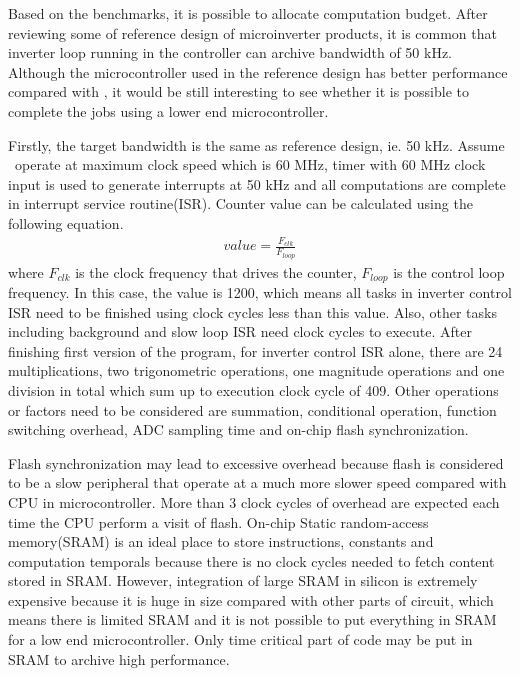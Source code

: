 Based on the benchmarks, it is possible to allocate computation budget. After reviewing some of reference design of  microinverter products, it is common that inverter loop running in the controller can archive bandwidth of 50 kHz. Although the microcontroller used in the reference design\cite{inverter_ref} has better performance compared with \tms, it would be still interesting to see whether it is possible to complete the jobs using a lower end microcontroller. 

Firstly, the target bandwidth is the same as reference design, ie. 50 kHz. Assume \tms~operate at maximum clock speed which is 60 MHz, timer with 60 MHz clock input is used to generate interrupts at 50 kHz and all computations are complete in interrupt service routine(ISR). Counter value can be calculated using the following equation. 
\begin{align}
    value = \frac{F_{clk}}{F_{loop}}
\end{align}
where ${F_{clk}}$ is the clock frequency that drives the counter, $F_{loop}$ is the control loop frequency. In this case, the value is 1200, which means all tasks in inverter control ISR need to be finished using clock cycles less than this value. Also, other tasks including background and slow loop ISR need clock cycles to execute. After finishing first version of the program, for inverter control ISR alone, there are 24 multiplications, two trigonometric operations, one magnitude operations and one division in total which sum up to execution clock cycle of 409. Other operations or factors need to be considered are summation, conditional operation, function switching overhead, \gls{ADC} sampling time  and on-chip flash synchronization. 

Flash synchronization may lead to excessive overhead because flash is considered to be a slow peripheral that operate at a much more slower speed compared with \gls{CPU} in microcontroller. More than 3 clock cycles of overhead are expected each time the \gls{CPU} perform a visit of flash. On-chip Static random-access memory(SRAM) is an ideal place to store instructions, constants and computation temporals because there is no clock cycles needed to fetch content stored in SRAM. However, integration of large SRAM in silicon is extremely expensive because it is huge in size compared with other parts of circuit, which means there is limited SRAM and it is not possible to put everything in SRAM for a low end microcontroller. Only time critical part of code may be put in SRAM to archive high performance.

